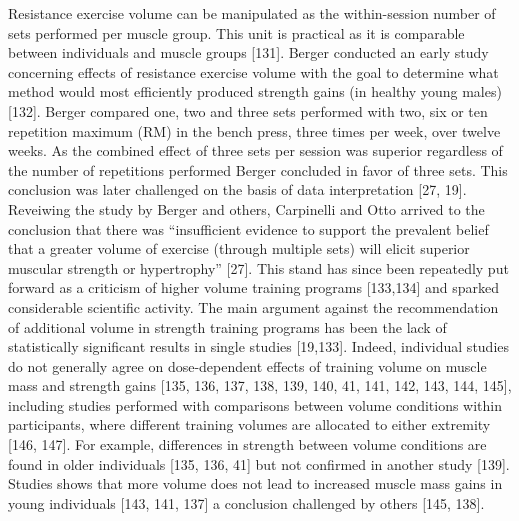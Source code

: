 \documentclass[twoside,10pt]{gihclass} %
\begin{document}
Resistance exercise volume can be manipulated as the within-session number of sets performed per muscle group. This unit is practical as it is comparable between individuals and muscle groups {[}131{]}.
Berger conducted an early study concerning effects of resistance exercise volume with the goal to determine what method would most efficiently produced strength gains (in healthy young males) {[}132{]}. Berger compared one, two and three sets performed with two, six or ten repetition maximum (RM) in the bench press, three times per week, over twelve weeks. As the combined effect of three sets per session was superior regardless of the number of repetitions performed Berger concluded in favor of three sets. This conclusion was later challenged on the basis of data interpretation
{[}27, 19{]}.
Reveiwing the study by Berger and others, Carpinelli and Otto arrived to the conclusion that there was ``insufficient evidence to support the prevalent belief that a greater volume of exercise (through multiple sets) will elicit superior muscular strength or hypertrophy'' {[}27{]}. This stand has since been repeatedly put forward as a criticism of higher volume training programs
{[}133,134{]} and sparked considerable scientific activity. The main argument against the recommendation of additional volume in strength training programs has been the lack of statistically significant results in single studies {[}19,133{]}.
Indeed, individual studies do not generally agree on dose-dependent effects of training volume on muscle mass and strength gains
{[}135, 136, 137, 138, 139, 140, 41, 141, 142, 143, 144, 145{]},
including studies performed with comparisons between volume conditions within participants, where different training volumes are allocated to either extremity
{[}146, 147{]}.
For example, differences in strength between volume conditions are found in older individuals
{[}135, 136, 41{]}
but not confirmed in another study
{[}139{]}.
Studies shows that more volume does not lead to increased muscle mass gains in young individuals
{[}143, 141, 137{]}
a conclusion challenged by others
{[}145, 138{]}.
\end{document}
